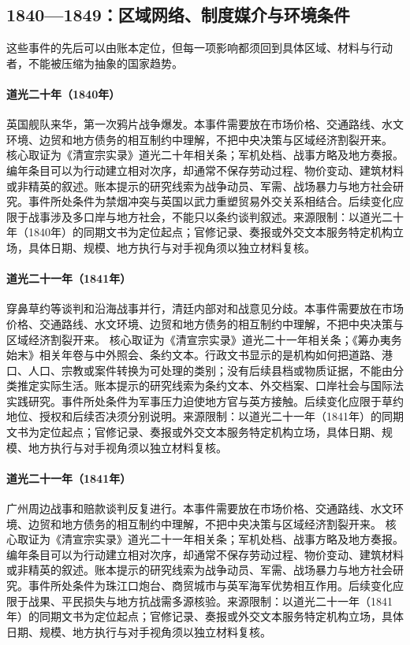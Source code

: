 \subsection{1840—1849：区域网络、制度媒介与环境条件}
这些事件的先后可以由账本定位，但每一项影响都须回到具体区域、材料与行动者，不能被压缩为抽象的国家趋势。
\hypertarget{civic:EQ-1840-FIRST-OPIUM-WAR}{}\paragraph{道光二十年（1840年）}英国舰队来华，第一次鸦片战争爆发。本事件需要放在市场价格、交通路线、水文环境、边贸和地方债务的相互制约中理解，不把中央决策与区域经济割裂开来。 核心取证为《清宣宗实录》道光二十年相关条；军机处档、战事方略及地方奏报。编年条目可以为行动建立相对次序，却通常不保存劳动过程、物价变动、建筑材料或非精英的叙述。账本提示的研究线索为战争动员、军需、战场暴力与地方社会研究。事件所处条件为禁烟冲突与英国以武力重塑贸易外交关系相结合。后续变化应限于战事涉及多口岸与地方社会，不能只以条约谈判叙述。来源限制：以道光二十年（1840年）的同期文书为定位起点；官修记录、奏报或外交文本服务特定机构立场，具体日期、规模、地方执行与对手视角须以独立材料复核。
\hypertarget{civic:EQ-1841-CHUANBI-NEGOTIATIONS}{}\paragraph{道光二十一年（1841年）}穿鼻草约等谈判和沿海战事并行，清廷内部对和战意见分歧。本事件需要放在市场价格、交通路线、水文环境、边贸和地方债务的相互制约中理解，不把中央决策与区域经济割裂开来。 核心取证为《清宣宗实录》道光二十一年相关条；《筹办夷务始末》相关年卷与中外照会、条约文本。行政文书显示的是机构如何把道路、港口、人口、宗教或案件转换为可处理的类别；没有后续县档或物质证据，不能由分类推定实际生活。账本提示的研究线索为条约文本、外交档案、口岸社会与国际法实践研究。事件所处条件为军事压力迫使地方官与英方接触。后续变化应限于草约地位、授权和后续否决须分别说明。来源限制：以道光二十一年（1841年）的同期文书为定位起点；官修记录、奏报或外交文本服务特定机构立场，具体日期、规模、地方执行与对手视角须以独立材料复核。
\hypertarget{civic:EQ-1841-CANTON-BATTLES}{}\paragraph{道光二十一年（1841年）}广州周边战事和赔款谈判反复进行。本事件需要放在市场价格、交通路线、水文环境、边贸和地方债务的相互制约中理解，不把中央决策与区域经济割裂开来。 核心取证为《清宣宗实录》道光二十一年相关条；军机处档、战事方略及地方奏报。编年条目可以为行动建立相对次序，却通常不保存劳动过程、物价变动、建筑材料或非精英的叙述。账本提示的研究线索为战争动员、军需、战场暴力与地方社会研究。事件所处条件为珠江口炮台、商贸城市与英军海军优势相互作用。后续变化应限于战果、平民损失与地方抗战需多源核验。来源限制：以道光二十一年（1841年）的同期文书为定位起点；官修记录、奏报或外交文本服务特定机构立场，具体日期、规模、地方执行与对手视角须以独立材料复核。
